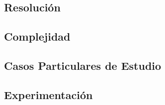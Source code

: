 \subsection{Resoluci\'on}
    

\subsection{Complejidad}
    

\subsection{Casos Particulares de Estudio}
    

\subsection{Experimentaci\'on\label{tabu:experimentacion}}
    
